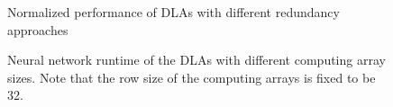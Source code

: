 \begin{figure}
\setlength{\abovecaptionskip}{-10pt}
\setlength{\belowcaptionskip}{-20pt}
    \caption{Normalized performance of DLAs with different redundancy approaches}
\label{fig:ratio}
\vspace{-1em}
\end{figure}

\begin{figure}
\setlength{\abovecaptionskip}{-2pt}
\setlength{\belowcaptionskip}{-10pt}
    \caption{Neural network runtime of the DLAs with different computing array sizes. Note that the row size of the computing arrays is fixed to be 32.}
\label{fig:model-performance}
\vspace{-1em}
\end{figure}

